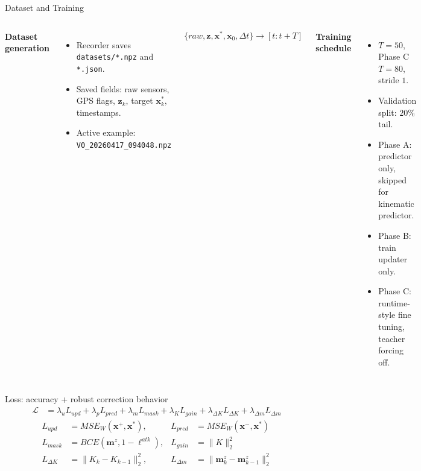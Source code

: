 \documentclass[aspectratio=169,11pt]{beamer}
\newcommand{\state}{\bm{x}}
\newcommand{\meas}{\bm{z}}
\begin{document}
\begin{frame}{Dataset and Training}
  \scriptsize
  \begin{columns}[T,onlytextwidth]
    \textbf{Dataset generation}
    \begin{itemize}
      \item Recorder saves \texttt{datasets/*.npz} and \texttt{*.json}.
      \item Saved fields: raw sensors, GPS flags, $\meas_k$, target $\state_k^\ast$, timestamps.
      \item Active example: \texttt{V0\_20260417\_094048.npz}
    \end{itemize}

    \[
      \{raw,\meas,\state^\ast,\state_0,\Delta t\}
      \rightarrow
      [t:t+T]
    \]

    \textbf{Training schedule}
    \begin{itemize}
      \item $T=50$, Phase C $T=80$, stride $1$.
      \item Validation split: $20\%$ tail.
      \item Phase A: predictor only, skipped for kinematic predictor.
      \item Phase B: train updater only.
      \item Phase C: runtime-style fine tuning, teacher forcing off.
    \end{itemize}
  \end{columns}

  \begin{block}{Loss: accuracy + robust correction behavior}
    \vspace{-0.9em}
    \[
    \begin{aligned}
      \mathcal{L} &=
      \lambda_u L_{upd}
      + \lambda_p L_{pred}
      + \lambda_m L_{mask}
      + \lambda_K L_{gain}
      + \lambda_{\Delta K}L_{\Delta K}
      + \lambda_{\Delta m}L_{\Delta m}
    \end{aligned}
    \]
    \[
    \begin{aligned}
      L_{upd} &= MSE_W(\state^+,\state^\ast),
      &L_{pred} &= MSE_W(\state^-,\state^\ast) \\
      L_{mask} &= BCE(\bm{m}^z,1-\bm{\ell}^{atk}),
      &L_{gain} &= \|K\|_2^2 \\
      L_{\Delta K} &= \|K_k-K_{k-1}\|_2^2,
      &L_{\Delta m} &= \|\bm{m}_k^z-\bm{m}_{k-1}^z\|_2^2
    \end{aligned}
    \]
    \vspace{-0.9em}
  \end{block}


\end{frame}
\end{document}
